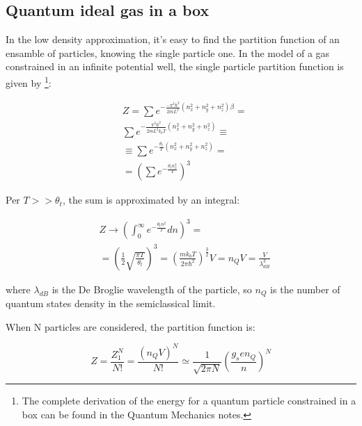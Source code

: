 \documentclass{article}
\begin{document}
\subsection{Quantum ideal gas in a box}

In the low density approximation, it's easy to find the partition function of an ensamble of particles,
knowing the single particle one.
In the model of a gas constrained in an infinite potential well, the single particle partition function is given by
\footnote{
    The complete derivation of the energy for a quantum particle constrained in a box can be found in the Quantum Mechanics notes.
}:

\begin{equation}
    \begin{aligned}
         & Z=\sum e^{-\frac{-\pi^2\hbar^2}{2mL^2}(n_x^2+n_y^2+n_z^2)\beta}=  \\
         & \sum e^{-\frac{\pi^2\hbar^2}{2mL^2k_bT}(n_x^2+n_y^2+n_z^2)}\equiv \\
         & \equiv\sum e^{-\frac{\theta_t}{T}(n_x^2+n_y^2+n_z^2)}=            \\
         & =\left(\sum e^{-\frac{\theta_tn_x^3}{T}}\right)^3
    \end{aligned}
\end{equation}

Per $T>>\theta_t$, the sum is approximated by an integral:

\begin{equation}
    \begin{aligned}
         & Z \rightarrow \left(\int_{0}^{\infty} e^{-\frac{\theta_tn^2}{T}}dn\right)^3=                                                                    \\
         & =\left(\frac{1}{2}\sqrt{\frac{\pi T}{\theta_t}}\right)^3= \left(\frac{mk_bT}{2\pi\hbar^2}\right)^{\frac{3}{2}}V= n_QV= \frac{V}{\lambda_{dB}^3}
    \end{aligned}
\end{equation}

where $\lambda_{dB}$ is the De Broglie wavelength of the particle, so $n_Q$ is the number of quantum states density in the semiclassical limit.

When N particles are considered, the partition function is:

\begin{equation}
    Z=\frac{Z_1^N}{N!}=\frac{(n_QV)^N}{N!}\simeq \frac{1}{\sqrt{2\pi N}}\left(\frac{g_sen_Q}{n}\right)^N
\end{equation}
\end{document}
